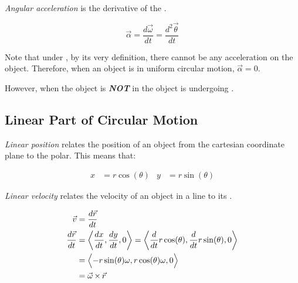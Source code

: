 \begin{definition} \label{def:Angular Acceleration}
  \emph{Angular acceleration} is the derivative of the .

  \begin{equation} \label{eq:Angular Acceleration}
    \vec{\alpha} = \frac{d \vec{\omega}}{dt} = \frac{d^{2} \vec{\theta}}{dt}
  \end{equation}

  \begin{remark}
    Note that under , by its very definition, there cannot be any acceleration on the object.
    Therefore, when an object is in uniform circular motion, $\vec{\alpha} = 0$.

    However, when the object is \textbf{\emph{NOT}} in  the object is undergoing .
  \end{remark}
\end{definition}

\subsection{Linear Part of Circular Motion} \label{subsec:Linear Circular Motion}
\begin{definition} \label{def:Linear Position}
  \emph{Linear position} relates the position of an object from the cartesian coordinate plane to the polar. 
  This means that:

  \begin{equation} \label{eq:Linear Position}
    \begin{aligned}
      x &= r \cos ( \theta ) & y &= r \sin ( \theta )
    \end{aligned}
  \end{equation}
\end{definition}

\begin{definition} \label{def:Linear Velocity}
  \emph{Linear velocity} relates the velocity of an object in a line to its .

  \begin{equation} \label{eq:Linear Velocity}
    \begin{aligned}
      \vec{v} &= \frac{d \vec{r}}{dt} \\
      \frac{d \vec{r}}{dt} &= \biggl \langle \frac{dx}{dt}, \frac{dy}{dt}, 0 \biggr \rangle = \biggl \langle \frac{d}{dt} r \cos ( \theta ), \frac{d}{dt} r \sin ( \theta ), 0 \biggr \rangle \\
      &= \Bigl \langle -r \sin ( \theta ) \omega, r \cos ( \theta ) \omega, 0 \Bigr \rangle \\
      &= \vec{\omega} \operatorname{\times} \vec{r}
    \end{aligned}
  \end{equation}
\end{definition}

